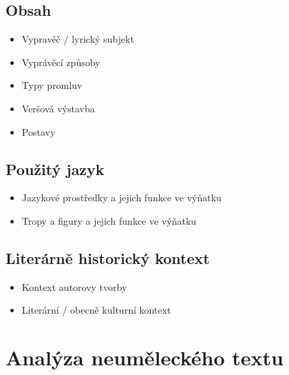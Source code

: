 \subsection{Obsah}
\begin{itemize}
\item Vypravěč / lyrický subjekt
\item Vyprávěcí způsoby
\item Typy promluv
\item Veršová výstavba
\item Postavy
\end{itemize}
\subsection{Použitý jazyk}
\begin{itemize}
\item Jazykové prostředky a jejich funkce ve výňatku
\item Tropy a figury a jejich funkce ve výňatku
\end{itemize}
\subsection{Literárně historický kontext}
\begin{itemize}
\item Kontext autorovy tvorby
\item Literární / obecně kulturní kontext
\end{itemize}

\newpage
\section{Analýza neuměleckého textu}
